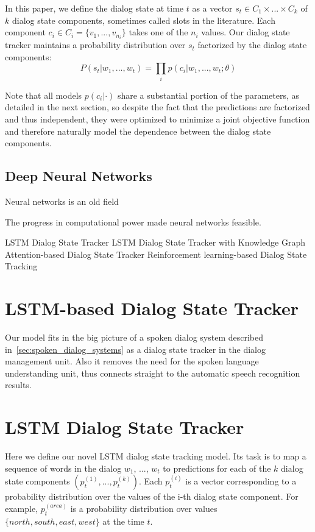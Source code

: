 \documentclass[11pt,twocolumn]{article}
\begin{document}
In this paper, we define the dialog state at time $t$ as a vector $s_t \in C_1 \times ... \times C_k$ of $k$ dialog state components, sometimes called slots in the literature. Each component $c_i \in C_i=\{v_1, ..., v_{n_i}\}$ takes one of the $n_i$ values. Our dialog state tracker maintains a probability distribution over $s_t$ factorized by the dialog state components:
$$P(s_t|w_1, ..., w_t)=\prod_i p(c_i|w_1, ..., w_t; \theta)$$

Note that all models $p(c_i|\cdot)$ share a substantial portion of the parameters, as detailed in the next section, so despite the fact that the predictions are factorized and thus independent, they were optimized to minimize a joint objective function and therefore naturally model the dependence between the dialog state components.




\subsection{Deep Neural Networks}
Neural networks is an old field

The progress in computational power made neural networks feasible.



LSTM Dialog State Tracker
LSTM Dialog State Tracker with Knowledge Graph
Attention-based Dialog State Tracker
Reinforcement learning-based Dialog State Tracking

\section{LSTM-based Dialog State Tracker}
Our model fits in the big picture of a spoken dialog system described in~\autoref{sec:spoken_dialog_systems} as a dialog state tracker in the dialog management unit. Also it removes the need for the spoken language understanding unit, thus connects straight to the automatic speech recognition results.

\section{LSTM Dialog State Tracker}
\label{sec:lstm_dialog_state_tracker}
Here we define our novel LSTM dialog state tracking model. Its task is to map a sequence of words in the dialog $w_1$, ..., $w_t$ to predictions for each of the $k$ dialog state components $(p^{(1)}_t, ..., p^{(k)}_t)$. Each $p^{(i)}_t$ is a vector corresponding to a probability distribution over the values of the i-th dialog state component. For example, $p^{(area)}_t$ is a probability distribution over values $\{north, south, east, west\}$ at the time $t$.
\end{document}
